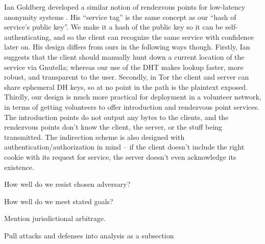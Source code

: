 \documentclass[times,10pt,twocolumn]{article}
\begin{document}
Ian Goldberg developed a similar notion of rendezvous points for
low-latency anonymity systems \cite{ian-thesis}. His ``service tag''
is the same concept as our ``hash of service's public key''. We make it
a hash of the public key so it can be self-authenticating, and so the
client can recognize the same service with confidence later on. His
design differs from ours in the following ways though. Firstly, Ian
suggests that the client should manually hunt down a current location of
the service via Gnutella; whereas our use of the DHT makes lookup faster,
more robust, and transparent to the user. Secondly, in Tor the client
and server can share ephemeral DH keys, so at no point in the path is
the plaintext
exposed. Thirdly, our design is much more practical for deployment in a
volunteer network, in terms of getting volunteers to offer introduction
and rendezvous point services. The introduction points do not output any
bytes to the clients, and the rendezvous points don't know the client,
the server, or the stuff being transmitted. The indirection scheme
is also designed with authentication/authorization in mind -- if the
client doesn't include the right cookie with its request for service,
the server doesn't even acknowledge its existence.


How well do we resist chosen adversary?

How well do we meet stated goals?

Mention jurisdictional arbitrage.

Pull attacks and defenses into analysis as a subsection

\label{sec:maintaining-anonymity}
\end{document}
